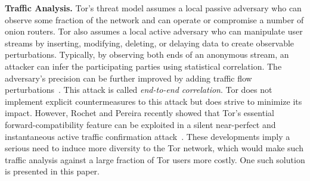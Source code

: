 

\textbf{Traffic Analysis.}
Tor's threat model assumes a local passive adversary who can observe some fraction of
the network and can operate or compromise a number of onion routers. Tor also
assumes a local active adversary who can manipulate user streams by inserting,
modifying, deleting, or delaying data to create observable perturbations.
Typically, by observing both ends of an anonymous stream, an attacker can infer
the participating parties using statistical correlation. The adversary's
precision can be further improved by adding traffic flow
perturbations~\cite{fu2009one}. This attack is called \textit{end-to-end
  correlation}. Tor does not implement explicit countermeasures to this attack
but does strive to minimize its impact. However, Rochet and Pereira recently
showed that Tor's essential forward-compatibility feature can be exploited in a
silent near-perfect and instantaneous active traffic confirmation
attack~\cite{rochet2018dropping}. These developments imply a serious need to
induce more diversity to the Tor network, which would make such traffic analysis
against a large fraction of Tor users more costly. One such solution is
presented in this paper.

